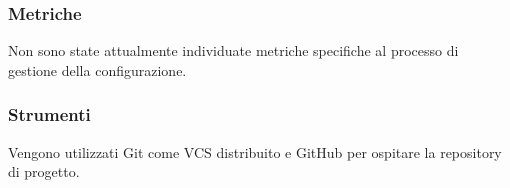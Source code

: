       \subsubsection{Metriche}
      Non sono state attualmente individuate metriche specifiche al processo di gestione della configurazione.
      \subsubsection{Strumenti}
      Vengono utilizzati Git come VCS distribuito e GitHub per ospitare la repository di progetto.
